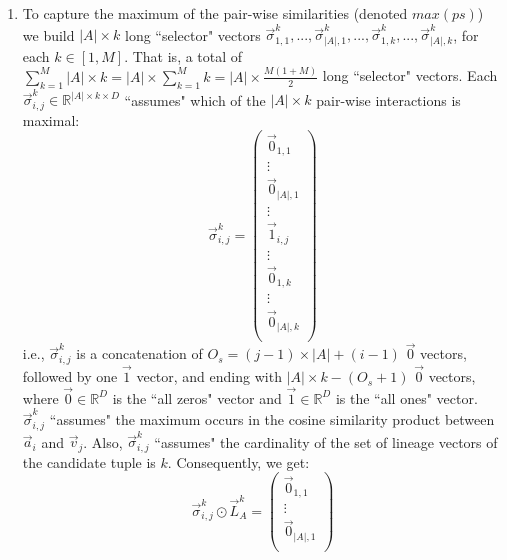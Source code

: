 \begin{enumerate}
    \item To capture the maximum of the pair-wise similarities (denoted $max(ps)$) we build $|A| \times k$ long ``selector" vectors $\vec{\sigma}_{1, 1}^k, ..., \vec{\sigma}_{|A|, 1}^k, ..., \vec{\sigma}_{1, k}^k, ..., \vec{\sigma}_{|A|, k}^k$, for each $k \in [1, M]$. 
    That is, a total of $\sum_{k=1}^M |A| \times k = |A| \times \sum_{k=1}^M k = |A| \times \frac{M(1 + M)}{2}$ long ``selector" vectors.
    Each $\vec{\sigma}_{i, j}^k \in \mathbb{R}^{|A| \times k \times D}$ ``assumes" which of the $|A| \times k$ pair-wise interactions is maximal:\\
    \begin{equation*}
        \vec{\sigma}_{i, j}^k = \begin{pmatrix}
                    \vec{0}_{1, 1}\\ 
                    \vdots\\ 
                    \vec{0}_{|A|, 1}\\ 
                   \vdots\\
                   \vec{1}_{i, j}\\ 
                   \vdots\\
                   \vec{0}_{1, k}\\ 
                   \vdots\\ 
                   \vec{0}_{|A|, k}\\ 
                   \end{pmatrix}
    \end{equation*}
    i.e., $\vec{\sigma}_{i, j}^k$ is a concatenation of $O_s = (j - 1) \times |A| + (i - 1)$ $\vec{0}$ vectors, followed by one $\vec{1}$ vector, and ending with $|A| \times k - (O_s + 1)$ $\vec{0}$ vectors,
    where $\vec{0} \in \mathbb{R}^D$ is the ``all zeros" vector and $\vec{1} \in \mathbb{R}^D$ is the ``all ones" vector. 
    $\vec{\sigma}_{i, j}^k$ ``assumes" the maximum occurs in the cosine similarity product between $\vec{a}_i$ and $\vec{v}_j$. Also, $\vec{\sigma}_{i, j}^k$ ``assumes" the cardinality of the set of lineage vectors of the candidate tuple is $k$.
    Consequently, we get:\\
    \begin{equation*}
        \vec{\sigma}_{i, j}^k \odot \vec{L}_{A}^k = \begin{pmatrix}
                    \vec{0}_{1, 1}\\ 
                    \vdots\\ 
                    \vec{0}_{|A|, 1}\\ 

\end{pmatrix}
\end{equation*}
\end{enumerate}
